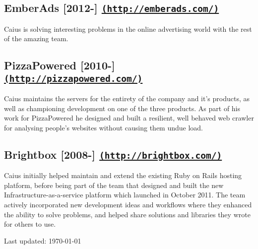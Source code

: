 \documentclass[letterpaper]{article}
\begin{document}
\subsection*{EmberAds [2012-\the\year] \href{http://emberads.com/}{\tt (http://emberads.com/)}} %
\label{sub:employment_emberads}

Caius is solving interesting problems in the online advertising world with the rest of the amazing team.


\subsection*{PizzaPowered [2010-\the\year] \href{http://pizzapowered.com/}{\tt (http://pizzapowered.com/)}} %
\label{sub:pizzapowered}

Caius maintains the servers for the entirety of the company and it's products, as well as championing development on one of the three products. As part of his work for PizzaPowered he designed and built a resilient, well behaved web crawler for analysing people's websites without causing them undue load.


\subsection*{Brightbox [2008-\the\year] \href{http://brightbox.com/}{\tt (http://brightbox.com/)}} %
\label{sub:brightbox}

Caius initially helped maintain and extend the existing Ruby on Rails hosting platform, before being part of the team that designed and built the new Infrastructure-as-a-service platform which launched in October 2011. The team actively incorporated new development ideas and workflows where they enhanced the ability to solve problems, and helped share solutions and libraries they wrote for others to use.

\bigskip

\begin{center}
  \begin{footnotesize}
    Last updated: \today
  \end{footnotesize}
\end{center}
\end{document}
